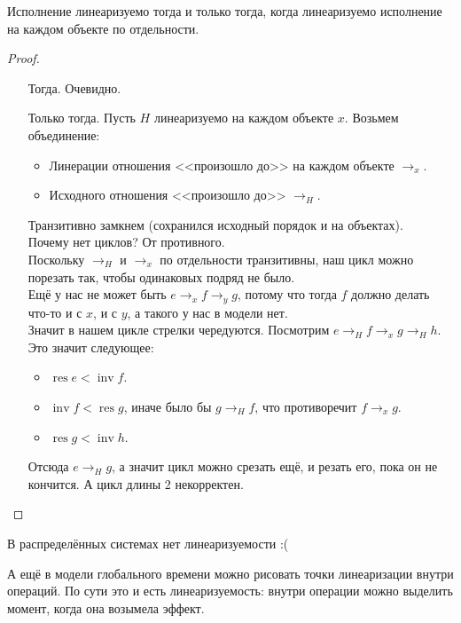 \documentclass{article}
\DeclareMathOperator{\inv}{inv}
\DeclareMathOperator{\res}{res}
\begin{document}
\begin{theorem}
    Исполнение линеаризуемо тогда и только тогда, когда линеаризуемо исполнение на каждом объекте по отдельности.
\end{theorem}
\begin{proof}
    \mbox{}\\
    \begin{itemize}
        \item[Тогда.] Очевидно.
        \item[Только тогда.] Пусть $H$ линеаризуемо на каждом объекте $x$. Возьмем объединение:
        \begin{itemize}
            \item Линерации отношения <<произошло до>> на каждом объекте $\to_x$.
            \item Исходного отношения <<произошло до>> $\to_H$.
        \end{itemize}
        Транзитивно замкнем (сохранился исходный порядок и на объектах).\\
        Почему нет циклов? От противного.\\
        Поскольку $\to_H$ и $\to_x$ по отдельности транзитивны, наш цикл можно порезать так, чтобы одинаковых подряд не было.\\
        Ещё у нас не может быть $e\to_xf\to_yg$, потому что тогда $f$ должно делать что-то и с $x$, и с $y$, а такого у нас в модели нет.\\
        Значит в нашем цикле стрелки чередуются. Посмотрим $e\to_Hf\to_xg\to_Hh$. Это значит следующее:
        \begin{itemize}
            \item $\res e<\inv f$.
            \item $\inv f<\res g$, иначе было бы $g\to_Hf$, что противоречит $f\to_xg$.
            \item $\res g<\inv h$.
        \end{itemize}
        Отсюда $e\to_H g$, а значит цикл можно срезать ещё, и резать его, пока он не кончится. А цикл длины 2 некорректен.
    \end{itemize}
\end{proof}
\begin{remark}
    В распределённых системах нет линеаризуемости :(
\end{remark}
\begin{remark}
    А ещё в модели глобального времени можно рисовать точки линеаризации внутри операций. По сути это и есть линеаризуемость: внутри операции можно выделить момент, когда она возымела эффект.
\end{remark}
\end{document}
